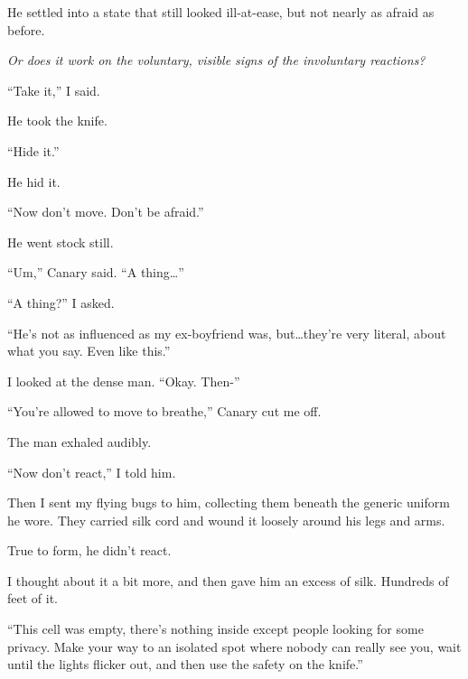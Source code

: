 He settled into a state that still looked ill-at-ease, but not nearly as afraid as before.



\emph{Or does it work on the voluntary, visible signs of the involuntary reactions?}



``Take it,'' I said.



He took the knife.



``Hide it.''



He hid it.



``Now don't move.  Don't be afraid.''



He went stock still.



``Um,'' Canary said.  ``A thing\ldots''



``A thing?'' I asked.



``He's not as influenced as my ex-boyfriend was, but\ldots they're very literal, about what you say.  Even like this.''



I looked at the dense man.  ``Okay.  Then-''



``You're allowed to move to breathe,'' Canary cut me off.



The man exhaled audibly.



``Now don't react,'' I told him.



Then I sent my flying bugs to him, collecting them beneath the generic uniform he wore.  They carried silk cord and wound it loosely around his legs and arms.



True to form, he didn't react.



I thought about it a bit more, and then gave him an excess of silk.  Hundreds of feet of it.



``This cell was empty, there's nothing inside except people looking for some privacy.  Make your way to an isolated spot where nobody can really see you, wait until the lights flicker out, and then use the safety on the knife.''



